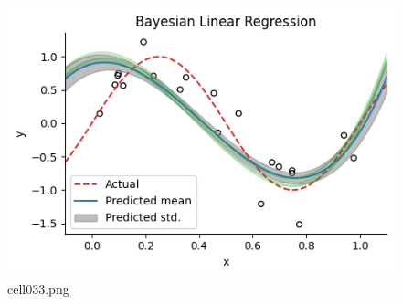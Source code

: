 \begin{figure}[ht]
	\centering
	\includegraphics[scale=0.8, max width=\linewidth]{./fig/bayesian-brain/mcmc/cell033.png}
	\caption{cell033.png}
	\label{cell033.png}
\end{figure}